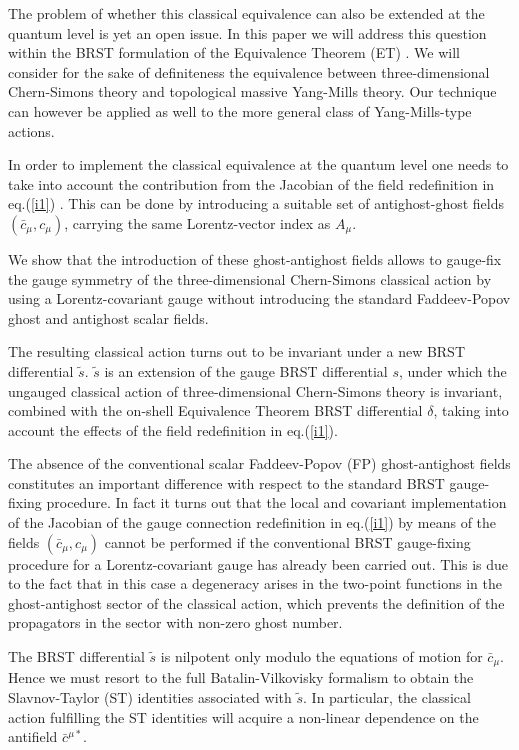\documentclass[a4paper,11pt]{article}
\begin{document}
The problem of whether this classical equivalence can also be extended
at the quantum level is yet an open issue. 
In this paper we will address this question within 
the BRST formulation of the Equivalence Theorem (ET) \cite{ET}.
We will consider for the sake of definiteness the equivalence
between three-dimensional Chern-Simons theory and topological 
massive Yang-Mills theory.
Our technique can however be applied as well to the more general
class of Yang-Mills-type actions.

In order to implement the classical equivalence at the quantum level
one needs to take into account the contribution from the Jacobian
of the field  redefinition in eq.(\ref{i1}) \cite{ET}.
This can be done by introducing
a suitable set of antighost-ghost fields $(\bar c_\mu,c_\mu)$, carrying the
same Lorentz-vector index as $A_\mu$.

We show that 
the introduction of these ghost-antighost fields
allows to gauge-fix the gauge symmetry of the three-dimensional
Chern-Simons classical action by using a Lorentz-covariant gauge
without introducing the standard Faddeev-Popov 
ghost and antighost scalar fields.

The resulting classical action turns out to be invariant under a new BRST
differential $\tilde s$. 
%
$\tilde s$ is
an extension of the gauge BRST differential $s$, under which the ungauged
classical action of three-dimensional Chern-Simons theory is invariant,
 combined with
the on-shell Equivalence Theorem BRST differential  \cite{ET} $\delta$,
taking into account the effects of the field redefinition in eq.(\ref{i1}).

The absence of the conventional scalar Faddeev-Popov (FP) 
ghost-anti\-ghost fields
constitutes an important difference with respect to the standard 
BRST gauge-fixing procedure. 
%
In fact 
it turns out that the local and covariant implementation 
of the Jacobian of the gauge connection redefinition in eq.(\ref{i1}) 
by means of the fields $(\bar c_\mu,c_\mu)$ cannot be performed
if the conventional BRST gauge-fixing procedure  for a Lorentz-covariant
gauge has already been carried out. This is due to the fact that 
in this case a degeneracy arises 
in the two-point functions in the ghost-antighost
sector of the classical action, which prevents the definition of the
propagators in the sector with non-zero ghost number.

The BRST differential 
$\tilde s$ is nilpotent only modulo the equations of motion
for $\bar c_\mu$. Hence we must resort to the full Batalin-Vilkovisky
\cite{gomis} formalism to obtain the Slavnov-Taylor (ST) identities
associated with $\tilde s$. In particular, the classical action
fulfilling the ST identities will acquire a non-linear dependence
on the antifield $\bar c^{\mu *}$.
\end{document}
